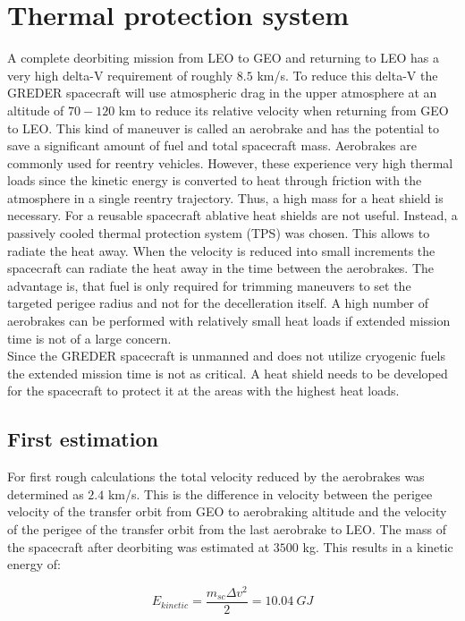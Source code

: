 \chapter{Thermal protection system}

\qquad A complete deorbiting mission from LEO to GEO and returning to LEO has a very high delta-V requirement of  roughly $8.5$ km/s. To reduce this delta-V the GREDER spacecraft will use atmospheric drag in the upper atmosphere at an altitude of $70-120$ km to reduce its relative velocity when returning from GEO to LEO. This kind of maneuver is called an aerobrake and has the potential to save a significant amount of fuel and total spacecraft mass. Aerobrakes are commonly used for reentry vehicles. However, these experience very high thermal loads since the kinetic energy is converted to heat through friction with the atmosphere in a single reentry trajectory. Thus, a high mass for a heat shield is necessary. For a reusable spacecraft ablative heat shields are not useful. Instead, a passively cooled thermal protection system (TPS) was chosen. This allows to radiate the heat away. When the velocity is reduced into small increments the spacecraft can radiate the heat away in the time between the aerobrakes. The advantage is, that fuel is only required for trimming maneuvers to set the targeted perigee radius and not for the decelleration itself. A high number of aerobrakes can be performed with relatively small heat loads if extended mission time is not of a large concern.\\

Since the GREDER spacecraft is unmanned and does not utilize cryogenic fuels the extended mission time is not as critical. A heat shield needs to be developed for the spacecraft to protect it at the areas with the highest heat loads.

\section{First estimation}

\qquad For first rough calculations the total velocity reduced by the aerobrakes was determined as $2.4$ km/s. This is the difference in velocity between the perigee velocity of the transfer orbit from GEO to aerobraking altitude and the velocity of the perigee of the transfer orbit from the last aerobrake to LEO. The mass of the spacecraft after deorbiting was estimated at $3500$ kg. This results in a kinetic energy of:

\begin{equation}
	E_{kinetic} = \frac{m_{sc}\Delta v^2}{2} = 10.04\ GJ
\end{equation}

